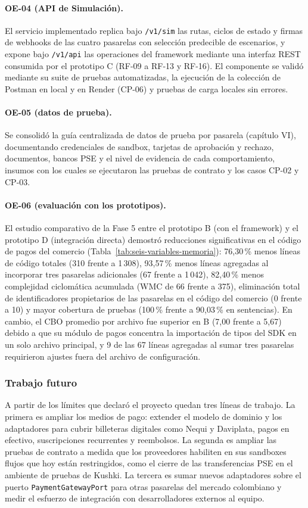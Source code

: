 \paragraph{OE-04 (API de Simulación).} El servicio implementado replica bajo \texttt{/v1/sim} las rutas, ciclos de estado y firmas de webhooks de las cuatro pasarelas con selección predecible de escenarios, y expone bajo \texttt{/v1/api} las operaciones del framework mediante una interfaz REST consumida por el prototipo C (RF-09 a RF-13 y RF-16). El componente se validó mediante su suite de pruebas automatizadas, la ejecución de la colección de Postman en local y en Render (CP-06) y pruebas de carga locales sin errores.

\paragraph{OE-05 (datos de prueba).} Se consolidó la guía centralizada de datos de prueba por pasarela (capítulo VI), documentando credenciales de sandbox, tarjetas de aprobación y rechazo, documentos, bancos PSE y el nivel de evidencia de cada comportamiento, insumos con los cuales se ejecutaron las pruebas de contrato y los casos CP-02 y CP-03.

\paragraph{OE-06 (evaluación con los prototipos).} El estudio comparativo de la Fase 5 entre el prototipo B (con el framework) y el prototipo D (integración directa) demostró reducciones significativas en el código de pagos del comercio (Tabla~\ref{tab:seis-variables-memoria}): 76,30\,\% menos líneas de código totales (310 frente a 1\,308), 93,57\,\% menos líneas agregadas al incorporar tres pasarelas adicionales (67 frente a 1\,042), 82,40\,\% menos complejidad ciclomática acumulada (WMC de 66 frente a 375), eliminación total de identificadores propietarios de las pasarelas en el código del comercio (0 frente a 10) y mayor cobertura de pruebas (100\,\% frente a 90,03\,\% en sentencias). En cambio, el CBO promedio por archivo fue superior en B (7,00 frente a 5,67) debido a que su módulo de pagos concentra la importación de tipos del SDK en un solo archivo principal, y 9 de las 67 líneas agregadas al sumar tres pasarelas requirieron ajustes fuera del archivo de configuración.

\subsubsection{Trabajo futuro}
A partir de los límites que declaró el proyecto quedan tres líneas de trabajo. La primera es ampliar los medios de pago: extender el modelo de dominio y los adaptadores para cubrir billeteras digitales como Nequi y Daviplata, pagos en efectivo, suscripciones recurrentes y reembolsos. La segunda es ampliar las pruebas de contrato a medida que los proveedores habiliten en sus sandboxes flujos que hoy están restringidos, como el cierre de las transferencias PSE en el ambiente de pruebas de Kushki. La tercera es sumar nuevos adaptadores sobre el puerto \texttt{PaymentGatewayPort} para otras pasarelas del mercado colombiano y medir el esfuerzo de integración con desarrolladores externos al equipo.
